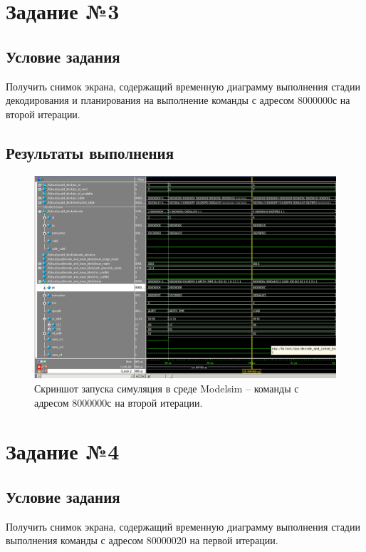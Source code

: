 \clearpage

\section{Задание №3}

\subsection*{Условие задания}
Получить снимок экрана, содержащий временную диаграмму выполнения стадии декодирования и планирования на выполнение команды с адресом 8000000с на второй итерации.

\subsection*{Результаты выполнения}

\begin{figure}[h]
	\centering
	\includegraphics[height=0.42\textheight]{img/t3-modelsim}
	\caption{Скриншот запуска симуляция в среде Modelsim -- команды с адресом 8000000с на второй итерации.}
	\label{img:t3-modelsim}
\end{figure}

\section{Задание №4}

\subsection*{Условие задания}
Получить снимок экрана, содержащий временную диаграмму выполнения стадии выполнения команды с адресом 80000020 на первой итерации.

